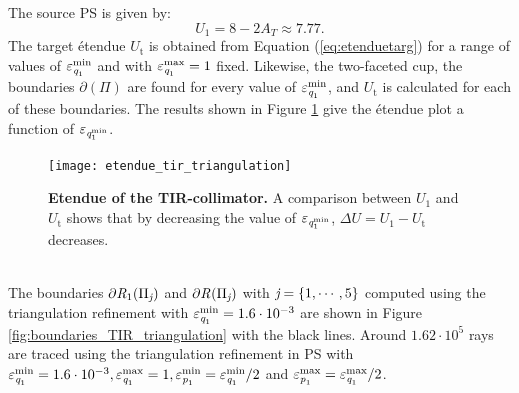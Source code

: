 The source PS is given by:
\begin{equation}
U_1 = 8-2A_T\approx 7.77.
\end{equation}
The target \'{e}tendue $U_{\textrm{t}}$ is obtained from Equation (\ref{eq:etenduetarg}) for a range of values of $\varepsilon_{\textit{q}_1}^{\textrm{min}}$ and with $\varepsilon_{\textit{q}_1}^{\textrm{max}}=1$ fixed. Likewise, the two-faceted cup, the boundaries $\partial$$(\Pi)$ are found for every value of $\varepsilon_{\textit{q}_1}^{\textrm{min}}$, and $U_{\textrm{t}}$ is calculated for each of these boundaries. 
The results shown in Figure \ref{fig:etendue_tir_triangulation} give the \'{e}tendue plot a function of $\varepsilon_{\textit{q}_{1}^{\textrm{min}}}$.
 \begin{figure}[h!]
  \center
  \texttt{[image: etendue\_tir\_triangulation]}
  \caption{\textbf{Etendue of the TIR-collimator.} A comparison between $U_1$ and $U_{\textrm{t}}$ shows that by decreasing the value of $\varepsilon_{\textit{q}_{1}^{\textrm{min}}}$, $\Delta U= U_1-U_{\textrm{t}}$ decreases.}
  \label{fig:etendue_tir_triangulation}
\end{figure}
\\ \indent The boundaries $\partial\mbox{$\emph{R}_{\textit{$1$}}$}(\Pi_{\textit{j}})$ and $\partial\mbox{$\emph{R}_{\textit{}}$}(\Pi_{\textit{j}})$ with $\textit{j} = \{1, \cdots, 5\}$ computed using the triangulation refinement with 
$\varepsilon_{\textit{q}_1}^{\textrm{min}}=1.6\cdot 10^{-3}$ are shown in Figure \ref{fig:boundaries_TIR_triangulation} with the black lines. Around $1.62 \cdot 10^5$ rays are traced using the triangulation refinement in PS with $\varepsilon_{\textit{q}_1}^{\textrm{min}}=1.6\cdot 10^{-3}, \varepsilon_{\textit{q}_1}^{\textrm{max}}=1, \varepsilon_{\textit{p}_1}^{\textrm{min}}=\varepsilon_{\textit{q}_1}^{\textrm{min}}/2$ and $\varepsilon_{\textit{p}_1}^{\textrm{max}} = \varepsilon_{\textit{q}_1}^{\textrm{max}}/2$.
